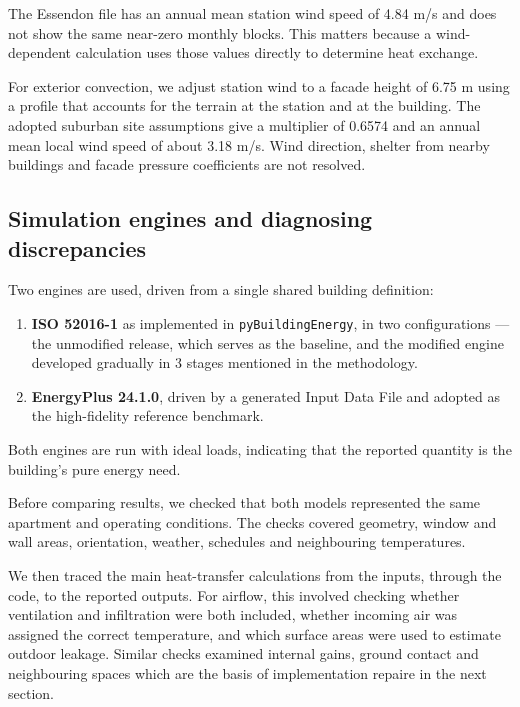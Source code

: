 \documentclass[12pt, a4paper]{article}
\begin{document}
The Essendon file has an annual mean station wind speed of 4.84 m/s and does not show the same near-zero monthly blocks. This matters because a wind-dependent calculation uses those values directly to determine heat exchange.

For exterior convection, we adjust station wind to a facade height of 6.75 m using a profile that accounts for the terrain at the station and at the building. The adopted suburban site assumptions give a multiplier of 0.6574 and an annual mean local wind speed of about 3.18 m/s. Wind direction, shelter from nearby buildings and facade pressure coefficients are not resolved.


\subsection{Simulation engines and diagnosing discrepancies}
\label{sec:engines}
Two engines are used, driven from a single shared building definition:
 
\begin{enumerate}
\item \textbf{ISO 52016-1} as implemented in \texttt{pyBuildingEnergy}, in two
  configurations --- the unmodified release, which serves as the baseline, and
  the modified engine developed gradually in 3 stages mentioned in the methodology.
\item \textbf{EnergyPlus 24.1.0}, driven by a generated Input Data File and
  adopted as the high-fidelity reference benchmark.
\end{enumerate}

Both engines are run with ideal loads, indicating that the reported quantity is the
building’s pure energy need.

Before comparing results, we checked that both models represented the same apartment and operating conditions. The checks covered geometry, window and wall areas, orientation, weather, schedules and neighbouring temperatures. 

We then traced the main heat-transfer calculations from the inputs, through the code, to the reported outputs. For airflow, this involved checking whether ventilation and infiltration were both included, whether incoming air was assigned the correct temperature, and which surface areas were used to estimate outdoor leakage. Similar checks examined internal gains, ground contact and neighbouring spaces which are the basis of implementation repaire in the next section.
\end{document}

